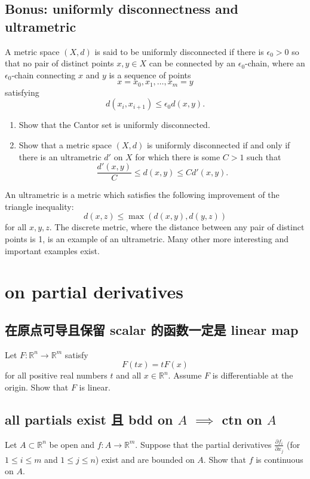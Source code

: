 \documentclass[lang=cn,11pt]{template}
\begin{document}
\section{Bonus: uniformly disconnectness and ultrametric}
A metric space \( (X, d) \) is said to be uniformly disconnected if there is \( \epsilon_0 > 0 \) so that no pair of distinct points \( x, y \in X \) can be connected by an \( \epsilon_0 \)-chain, where an \( \epsilon_0 \)-chain connecting \( x \) and \( y \) is a sequence of points
\[
x = x_0, x_1, \dots, x_m = y
\]
satisfying
\[
d(x_i, x_{i+1}) \leq \epsilon_0 d(x, y).
\]
\begin{enumerate}
    \item Show that the Cantor set is uniformly disconnected.
    \item Show that a metric space \( (X, d) \) is uniformly disconnected if and only if there is an ultrametric \( d' \) on \( X \) for which there is some \( C > 1 \) such that
    \[
    \frac{d'(x, y)}{C} \leq d(x, y) \leq C d'(x, y).
    \]
\end{enumerate}
An ultrametric is a metric which satisfies the following improvement of the triangle inequality:
\[
d(x, z) \leq \max(d(x, y), d(y, z))
\]
for all \( x, y, z \). The discrete metric, where the distance between any pair of distinct points is 1, is an example of an ultrametric. Many other more interesting and important examples exist.






\chapter{on partial derivatives}

\section{在原点可导且保留 scalar 的函数一定是 linear map}
Let \( F : \mathbb{R}^n \to \mathbb{R}^m \) satisfy
\[
F(tx) = tF(x)
\]
for all positive real numbers \( t \) and all \( x \in \mathbb{R}^n \). Assume \( F \) is differentiable at the origin. Show that \( F \) is linear.

\section{all partials exist 且 bdd on $A$ $\implies$ ctn on $A$}
Let \( A \subset \mathbb{R}^n \) be open and \( f : A \to \mathbb{R}^m \). Suppose that the partial derivatives \( \frac{\partial f_i}{\partial x_j} \) (for \( 1 \leq i \leq m \) and \( 1 \leq j \leq n \)) exist and are bounded on \( A \). Show that \( f \) is continuous on \( A \).
\end{document}
